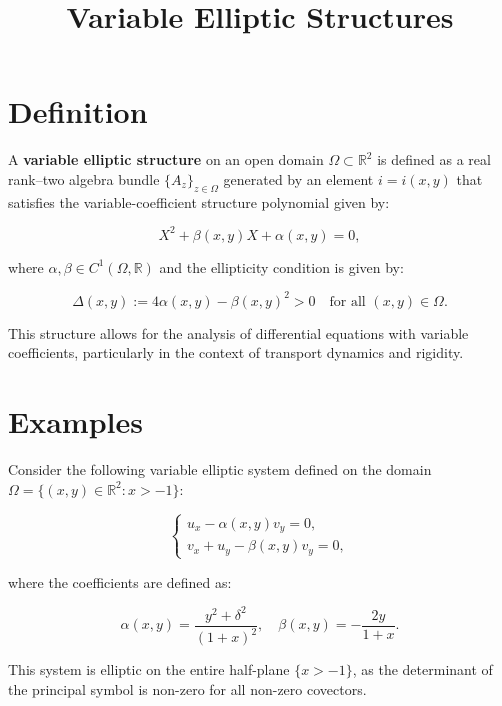 \documentclass[11pt,a4paper]{article}
\title{Variable Elliptic Structures}
\date{}
\begin{document}
\maketitle
\section{Definition}
A \textbf{variable elliptic structure} on an open domain $\Omega \subset \mathbb{R}^2$ is defined as a real rank–two algebra bundle $\{A_z\}_{z \in \Omega}$ generated by an element $i = i(x, y)$ that satisfies the variable-coefficient structure polynomial given by:

\begin{equation}
X^2 + \beta(x, y) X + \alpha(x, y) = 0,
\end{equation}

where $\alpha, \beta \in C^1(\Omega, \mathbb{R})$ and the ellipticity condition is given by:

\begin{equation}
\Delta(x, y) := 4\alpha(x, y) - \beta(x, y)^2 > 0 \quad \text{for all } (x, y) \in \Omega.
\end{equation}

This structure allows for the analysis of differential equations with variable coefficients, particularly in the context of transport dynamics and rigidity.

\section{Examples}
Consider the following variable elliptic system defined on the domain $\Omega = \{(x, y) \in \mathbb{R}^2 : x > -1\}$:

\begin{equation}
\begin{cases}
u_x - \alpha(x, y) v_y = 0, \\
v_x + u_y - \beta(x, y) v_y = 0,
\end{cases}
\end{equation}

where the coefficients are defined as:

\begin{equation}
\alpha(x, y) = \frac{y^2 + \delta^2}{(1 + x)^2}, \quad \beta(x, y) = -\frac{2y}{1 + x}.
\end{equation}

This system is elliptic on the entire half-plane $\{x > -1\}$, as the determinant of the principal symbol is non-zero for all non-zero covectors.
\end{document}
